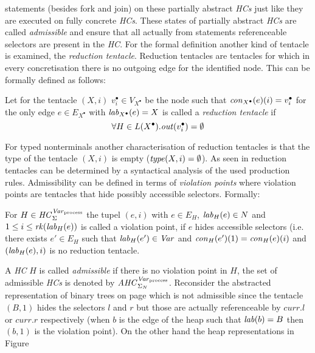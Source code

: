 	statements (besides fork and join) on these partially abstract
	\emph{\acp{HC}} just like they are executed on fully concrete
	\emph{\acp{HC}}. These states of partially abstract \emph{\acp{HC}} are
	called \emph{admissible} and ensure that all actually from statements
	referenceable selectors are present in the \emph{\ac{HC}}. For the formal
	definition another kind of tentacle is examined, the \emph{reduction
	tentacle}. Reduction tentacles are tentacles for which in every
	concretisation there is no outgoing edge for the identified node. This can
	be formally defined as follows:
	\begin{definition}
		Let for the tentacle $(X,i)$ $v_i^{\bullet}\in V_{X^{\bullet}}$ be the 
		node such that $\mathit{con}_{X^{\bullet}}(e)(i) = v_{i}^{\bullet}$ for the only
		edge $e\in E_{X^{\bullet}}$ with $\mathit{lab}_{X^{\bullet}}(e) = X$ is called
		a \emph{reduction tentacle} if
		\begin{equation*}
			\forall H\in L(X^{\bullet}).\mathit{out}(v_{i}^{\bullet}) = \emptyset
		\end{equation*}
	\end{definition}
	For typed nonterminals another characterisation of reduction tentacles is
	that the type of the tentacle $(X,i)$ is empty ($\mathit{type}(X,i) = \emptyset$).
	As seen in \cite{LocalGreibachNormalForm} reduction tentacles can be
	determined by a syntactical analysis of the used production rules.
	Admissibility can be defined in terms of \emph{violation points} where
	violation points are tentacles that hide possibly accessible selectors.
	Formally:
	\begin{definition}
		For $H\in\mathit{HC}_{\Sigma}^{\mathit{Var}_{\text{process}}}$ the tupel $(e, i)$ with $e\in E_{H}$, $\mathit{lab}_{H}(e)\in N$
		and $1\leq i \leq \mathit{rk}(\mathit{lab}_{H}(e))$ is called a violation point, if $e$
		hides accessible selectors (i.e. there exists $e'\in E_{H}$ such that
		$\mathit{lab}_{H}(e')\in\mathit{Var}$ and $\mathit{con}_{H}(e')(1) = \mathit{con}_{H}(e)(i)$ and
		$(\mathit{lab}_{H}(e),i)$ is no reduction tentacle.
	\end{definition}
	A \emph{\ac{HC}} $H$ is called \emph{admissible} if there is no violation
	point in $H$, the set of admissible \emph{\acp{HC}} is denoted by $\mathit{AHC}_{\Sigma_{N}}^{\mathit{Var}_{\text{process}}}$.
	Reconsider the abstracted representation of binary trees on page
	\pageref{tikz:abstractedbintree} which is not admissible since the tentacle
	$(B,1)$ hides the selectors $l$ and $r$ but those are actually referenceable
	by $\mathit{curr}.l$ or $\mathit{curr}.r$ respectively (when $b$ is the
	edge of the heap such that $\mathit{lab}(b) = B$ then $(b,1)$ is the violation
	point). On the other hand the heap representations in Figure
